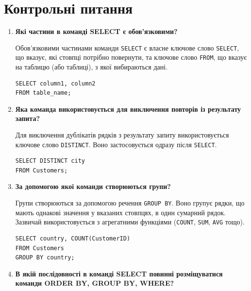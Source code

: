 \documentclass{article}
\begin{document}
    \section*{Контрольні питання}
    \begin{enumerate}[label=\arabic*., leftmargin=*]
        \item \textbf{Які частини в команді SELECT є обов’язковими?}
        
        Обов'язковими частинами команди \texttt{SELECT} є власне ключове слово \texttt{SELECT}, що вказує, які стовпці потрібно повернути, та ключове слово \texttt{FROM}, що вказує на таблицю (або таблиці), з якої вибираються дані.
        \begin{CodeBox}
        \begin{verbatim}
SELECT column1, column2
FROM table_name;
        \end{verbatim}
        \end{CodeBox}
        
        \item \textbf{Яка команда використовується для виключення повторів із результату запита?}
        
        Для виключення дублікатів рядків з результату запиту використовується ключове слово \texttt{DISTINCT}. Воно застосовується одразу після \texttt{SELECT}.
        \begin{CodeBox}
        \begin{verbatim}
SELECT DISTINCT city
FROM Customers;
        \end{verbatim}
        \end{CodeBox}
        
        \item \textbf{За допомогою якої команди створюються групи?}
        
        Групи створюються за допомогою речення \texttt{GROUP BY}. Воно групує рядки, що мають однакові значення у вказаних стовпцях, в один сумарний рядок. Зазвичай використовується з агрегатними функціями (\texttt{COUNT}, \texttt{SUM}, \texttt{AVG} тощо).
        \begin{CodeBox}
        \begin{verbatim}
SELECT country, COUNT(CustomerID)
FROM Customers
GROUP BY country;
        \end{verbatim}
        \end{CodeBox}
        
        \item \textbf{В якій послідовності в команді SELECT повинні розміщуватися команди ORDER BY, GROUP BY, WHERE?}
        

\end{enumerate}
\end{document}
